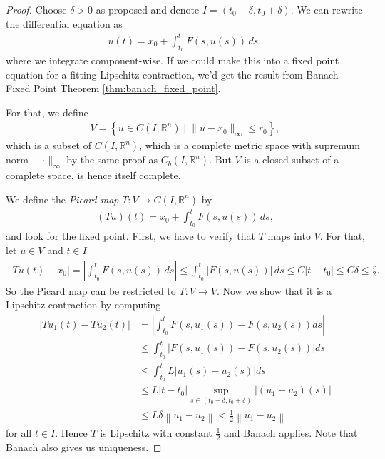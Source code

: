 \begin{proof}
	Choose $\delta > 0$ as proposed and denote $I = (t_{0} - \delta, t_{0}+\delta)$. We can rewrite the differential equation as
	\begin{align*}
		u(t) = x_{0} + \int_{t_{0}}^{t} F(s,u(s))  \, ds,
	\end{align*}
	where we integrate component-wise. If we could make this into a fixed point equation for a fitting Lipschitz contraction, we'd get the result from Banach Fixed Point Theorem \ref{thm:banach_fixed_point}.

	For that, we define
	\begin{align*}
		V = \left\{ u \in C(I, \mathbb{R}^{n}) \mid \lVert u - x_{0} \rVert_{\infty} \leq r_{0}  \right\},
	\end{align*}
	which is a subset of $C(I, \mathbb{R}^{n})$, which is a complete metric space with supremum norm $\lVert \cdot \rVert_{\infty}$ by the same proof as $C_{b}(I, \mathbb{R}^{n})$. But $V$ is a closed subset of a complete space, is hence itself complete.

	We define the \textit{Picard map} $T: V \to C(I, \mathbb{R}^{n})$ by
	\begin{align*}
		(Tu)(t) = x_{0} + \int_{t_{0}}^{t} F(s,u(s))  \, ds,
	\end{align*}
	and look for the fixed point. First, we have to verify that $T$ maps into $V$. For that, let $u \in V$ and $t \in I$
	\begin{align*}
		\left| Tu(t) - x_{0} \right| = \left| \int_{t_{0}}^{t} F(s,u(s))  \, ds \right| \leq \int_{t_{0}}^{t} \left| F(s, u(s)) \right|  \, ds \leq C \left| t-t_{0} \right| \leq C \delta \leq \frac{r}{2}.
	\end{align*}
	So the Picard map can be restricted to $T: V \to V$. Now we show that it is a Lipschitz contraction by computing
	\begin{align*}
		\left|T u_1(t)-T u_2(t)\right| & =\left|\int_{t_0}^t F\left(s, u_1(s)\right)-F\left(s, u_2(s)\right) d s\right|                                \\
		                               & \leq \int_{t_0}^t\left|F\left(s, u_1(s)\right)-F\left(s, u_2(s)\right)\right| d s                             \\
		                               & \leq \int_{t_0}^t L\left|u_1(s)-u_2(s)\right| d s                                                             \\
		                               & \leq L\left|t-t_0\right| \sup _{s \in\left(t_0-\delta, t_0+\delta\right)}\left|\left(u_1-u_2\right)(s)\right| \\
		                               & \leq L \delta\left\|u_1-u_2\right\|<\frac{1}{2}\left\|u_1-u_2\right\|
	\end{align*}
    for all $t \in I$. Hence $T$ is Lipschitz with constant $\frac{1}{2}$ and Banach applies. Note that Banach also gives us uniqueness.
\end{proof}

